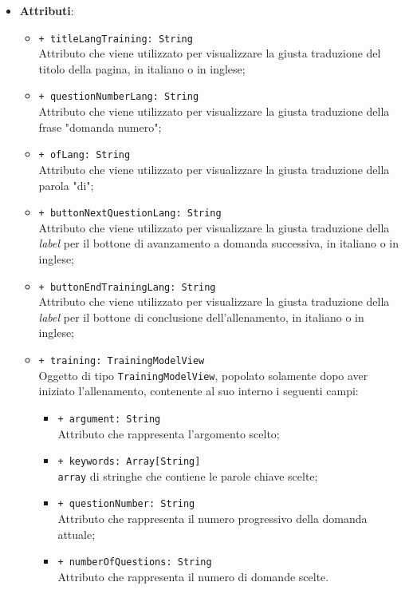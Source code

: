 \begin{itemize}
\begin{itemize}
	\end{itemize}
	\item \textbf{Attributi}:
	\begin{itemize}
		\item \texttt{+ titleLangTraining: String} \\ Attributo che viene utilizzato per visualizzare la giusta traduzione del titolo della pagina, in italiano o in inglese;
		\item \texttt{+ questionNumberLang: String} \\ Attributo che viene utilizzato per visualizzare la giusta traduzione della frase "domanda numero";
		\item \texttt{+ ofLang: String} \\ Attributo che viene utilizzato per visualizzare la giusta traduzione della parola "di";
		\item \texttt{+ buttonNextQuestionLang: String} \\ Attributo che viene utilizzato per visualizzare la giusta traduzione della \textit{label} per il bottone di avanzamento a domanda successiva, in italiano o in inglese;
		\item \texttt{+ buttonEndTrainingLang: String} \\ Attributo che viene utilizzato per visualizzare la giusta traduzione della \textit{label} per il bottone di conclusione dell'allenamento, in italiano o in inglese;
		\item \texttt{+ training: TrainingModelView} \\ Oggetto di tipo \texttt{TrainingModelView}, popolato solamente dopo aver iniziato l'allenamento, contenente al suo interno i seguenti campi:
		\begin{itemize}
			\item \texttt{+ argument: String} \\ Attributo che rappresenta l'argomento scelto;
			\item \texttt{+ keywords: Array[String]} \\ \texttt{array} di stringhe che contiene le parole chiave scelte;
			\item \texttt{+ questionNumber: String} \\ Attributo che rappresenta il numero progressivo della domanda attuale;
			\item \texttt{+ numberOfQuestions: String} \\ Attributo che rappresenta il numero di domande scelte.
		\end{itemize}
	\end{itemize}
\end{itemize}